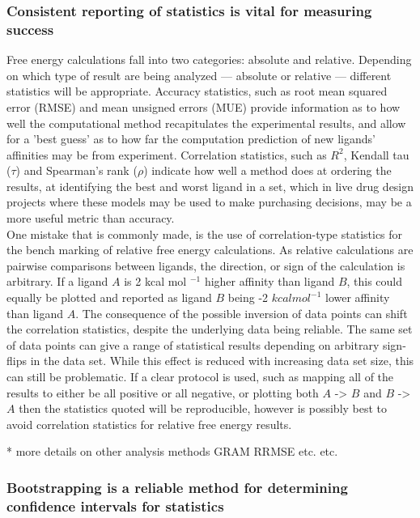 \documentclass[9pt,bestpractices]{livecoms}
\begin{document}
\subsubsection{Consistent reporting of statistics is vital for measuring success}
\label{sec:statistical_analysis}
Free energy calculations fall into two categories: absolute and relative. Depending on which type of result are being analyzed --- absolute or relative --- different statistics will be appropriate. Accuracy statistics, such as root mean squared error (RMSE) and mean unsigned errors (MUE) provide information as to how well the computational method recapitulates the experimental results, and allow for a 'best guess' as to how far the computation prediction of new ligands' affinities may be from experiment. Correlation statistics, such as $R^{2}$, Kendall tau ($\tau$) and Spearman's rank ($\rho$) indicate how well a method does at ordering the results, at identifying the best and worst ligand in a set, which in live drug design projects where these models may be used to make purchasing decisions, may be a more useful metric than accuracy.\\

One mistake that is commonly made, is the use of correlation-type statistics for the bench marking of relative free energy calculations. As relative calculations are pairwise comparisons between ligands, the direction, or sign of the calculation is arbitrary. If a ligand $A$ is 2 kcal mol $^{-1}$ higher affinity than ligand $B$, this could equally be plotted and reported as ligand $B$ being -2 $kcal mol ^{-1}$ lower affinity than ligand $A$. The consequence of the possible inversion of data points can shift the correlation statistics, despite the underlying data being reliable. The same set of data points can give a range of statistical results depending on arbitrary sign-flips in the data set. While this effect is reduced with increasing data set size, this can still be problematic. If a clear protocol is used, such as mapping all of the results to either be all positive or all negative, or plotting both $A$ -> $B$ and $B$ -> $A$ then the statistics quoted will be reproducible, however is possibly best to avoid correlation statistics for relative free energy results.



* more details on other analysis methods GRAM RRMSE etc. etc. 


\subsubsection{Bootstrapping is a reliable method for determining confidence intervals for statistics}
\end{document}
